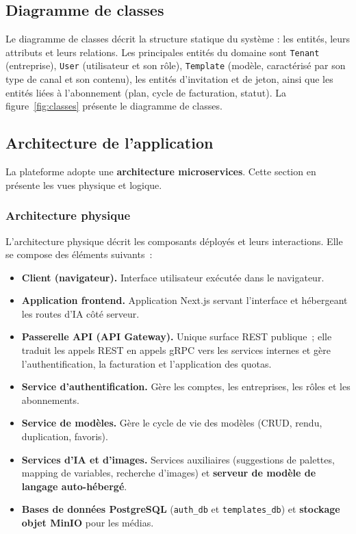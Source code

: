\subsection{Diagramme de classes}
Le diagramme de classes décrit la structure statique du système : les
entités, leurs attributs et leurs relations. Les principales entités du
domaine sont \texttt{Tenant} (entreprise), \texttt{User} (utilisateur et
son rôle), \texttt{Template} (modèle, caractérisé par son type de canal et
son contenu), les entités d'invitation et de jeton, ainsi que les entités
liées à l'abonnement (plan, cycle de facturation, statut). La
figure~\ref{fig:classes} présente le diagramme de classes.


\subsection{Architecture de l'application}
La plateforme adopte une \textbf{architecture microservices}. Cette section
en présente les vues physique et logique.

\subsubsection{Architecture physique}
L'architecture physique décrit les composants déployés et leurs
interactions. Elle se compose des éléments suivants~:

\begin{itemize}[leftmargin=1.4cm]
  \item \textbf{Client (navigateur).} Interface utilisateur exécutée dans le
  navigateur.
  \item \textbf{Application frontend.} Application Next.js servant
  l'interface et hébergeant les routes d'IA côté serveur.
  \item \textbf{Passerelle API (API Gateway).} Unique surface REST publique~;
  elle traduit les appels REST en appels gRPC vers les services internes et
  gère l'authentification, la facturation et l'application des quotas.
  \item \textbf{Service d'authentification.} Gère les comptes, les
  entreprises, les rôles et les abonnements.
  \item \textbf{Service de modèles.} Gère le cycle de vie des modèles
  (CRUD, rendu, duplication, favoris).
  \item \textbf{Services d'IA et d'images.} Services auxiliaires
  (suggestions de palettes, mapping de variables, recherche d'images) et
  \textbf{serveur de modèle de langage auto-hébergé}.
  \item \textbf{Bases de données PostgreSQL} (\texttt{auth\_db} et
  \texttt{templates\_db}) et \textbf{stockage objet MinIO} pour les médias.
\end{itemize}

